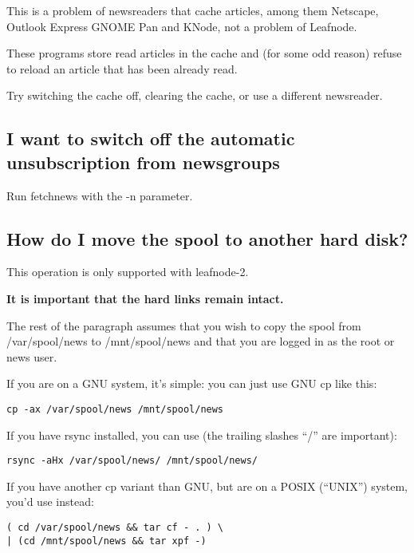 \documentclass[10pt,english,a5paper]{article}
\begin{document}
   This is a problem of newsreaders that cache articles, among them
   Netscape, Outlook Express GNOME Pan and KNode, not a problem of Leafnode.

   These programs store read articles in the cache and (for some odd
   reason) refuse to reload an article that has been already read.

   Try switching the cache off, clearing the cache, or use a different
   newsreader.

\subsection{I want to switch off the automatic unsubscription from
newsgroups}

   Run fetchnews with the -n parameter.

\subsection{How do I move the spool to another hard disk?}

This operation is only supported with leafnode-2.

\textbf{It is important that the hard links remain intact.}

The rest of the paragraph assumes that you wish to copy the spool from
/var/spool/news to /mnt/spool/news and that you are logged in as the
root or news user.

If you are on a GNU system, it's simple: you can just use GNU cp like this:
\begin{verbatim}
cp -ax /var/spool/news /mnt/spool/news
\end{verbatim}

If you have rsync installed, you can use (the trailing slashes ``/'' are
important):
\begin{verbatim}
rsync -aHx /var/spool/news/ /mnt/spool/news/
\end{verbatim}

If you have another cp variant than GNU, but are on a POSIX (``UNIX'')
system, you'd use instead:
\begin{verbatim}
( cd /var/spool/news && tar cf - . ) \
| (cd /mnt/spool/news && tar xpf -)
\end{verbatim}
   
\end{document}

